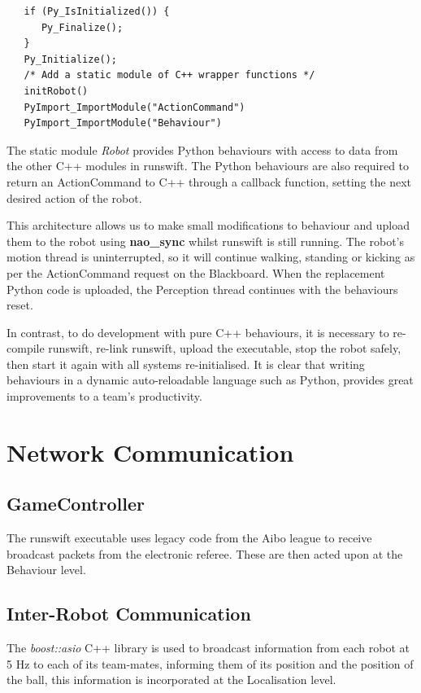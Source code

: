 \documentclass[pdftex,11pt,a4paper]{report}
\begin{document}
\begin{lstlisting}
   if (Py_IsInitialized()) {
      Py_Finalize();
   }
   Py_Initialize();
   /* Add a static module of C++ wrapper functions */
   initRobot()
   PyImport_ImportModule("ActionCommand")
   PyImport_ImportModule("Behaviour")
\end{lstlisting}

The static module \emph{Robot} provides Python behaviours with access to data from the other C++ modules in runswift. The Python behaviours are also required to return an ActionCommand to C++ through a callback function, setting the next desired action of the robot.

This architecture allows us to make small modifications to behaviour and upload them to the robot using \textbf{nao\_sync} whilst runswift is still running. The robot's motion thread is uninterrupted, so it will continue walking, standing or kicking as per the ActionCommand request on the Blackboard. When the replacement Python code is uploaded, the Perception thread continues with the behaviours reset.

In contrast, to do development with pure C++ behaviours, it is necessary to re-compile runswift, re-link runswift, upload the executable, stop the robot safely, then start it again with all systems re-initialised. It is clear that writing behaviours in a dynamic auto-reloadable language such as Python, provides great improvements to a team's productivity.

\section{Network Communication}

\subsection{GameController}

The runswift executable uses legacy code from the Aibo league to receive broadcast packets from the electronic referee. These are then acted upon at the Behaviour level.

\subsection{Inter-Robot Communication}

The \emph{boost::asio} C++ library is used to broadcast information from each robot at
5 Hz to each of its team-mates, informing them of its position and the position
of the ball, this information is incorporated at the Localisation level.
\end{document}
